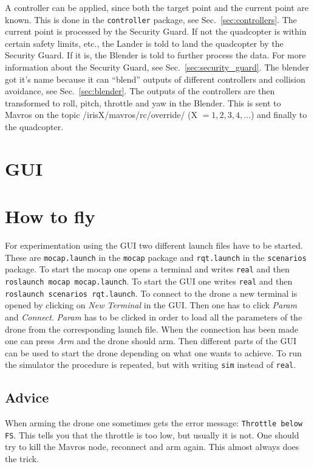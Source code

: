 \documentclass[titlepage,11pt,a4paper]{article}
\begin{document}
A controller can be applied, since both the target point and the
current point are known. This is done in the \texttt{controller}
package, see Sec.~\ref{sec:controllers}. The current point is processed by the Security Guard. If not
the quadcopter is within certain safety limits, etc., the Lander
is told to land the quadcopter by the Security Guard. If it is, the
Blender is told to further process the data. For more information
about the Security Guard, see Sec.~\ref{sec:security_guard}. The
blender got it's name because it can ``blend'' outputs of different
controllers and collision avoidance, see Sec.~\ref{sec:blender}. The
outputs of the controllers are then transformed to roll, pitch,
throttle and yaw in the Blender. This is sent to Mavros on the
topic /irisX/mavros/rc/override/ (X $= 1, 2, 3, 4, \dots$) and finally
to the quadcopter.


\section{GUI}
\label{sec:gui}


\section{How to fly}
For experimentation using the GUI two different launch files have to
be started. These are \texttt{mocap.launch} in the \texttt{mocap}
package and \texttt{rqt.launch} in the \texttt{scenarios} package. To
start the mocap one opens a terminal and writes \texttt{real} and then
\texttt{roslaunch mocap mocap.launch}. To start the GUI one writes
\texttt{real} and then \texttt{roslaunch scenarios rqt.launch}. To
connect to the drone a new terminal is opened by clicking on
\textit{New Terminal} in the GUI. Then one has to click \textit{Param}
and \textit{Connect}. \textit{Param} has to be clicked in order to
load all the parameters of the drone from the corresponding launch
file. When the connection has been made one can press \textit{Arm} and
the drone should arm. Then different parts of the GUI can be used to
start the drone depending on what one wants to achieve. To run the
simulator the procedure is repeated, but with writing \texttt{sim}
instead of \texttt{real}.

\subsection{Advice}
When arming the drone one sometimes gets the error message:
\texttt{Throttle below FS}. This tells you that the throttle is too
low, but usually it is not. One should try to kill the Mavros node,
reconnect and arm again. This almost always does the trick.
\end{document}
